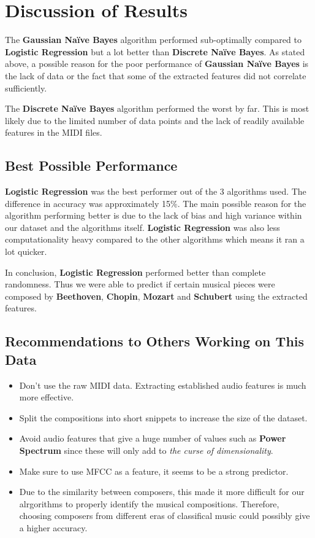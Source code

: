 \documentclass[11pt]{article}
\providecommand{\tightlist}{%
      \setlength{\itemsep}{0pt}\setlength{\parskip}{0pt}}
\begin{document}
\newpage

\section{Discussion of Results}\label{discussion-of-results}

The \textbf{Gaussian Naïve Bayes} algorithm performed sub-optimally
compared to \textbf{Logistic Regression} but a lot better than
\textbf{Discrete Naïve Bayes}. As stated above, a possible reason for
the poor performance of \textbf{Gaussian Naïve Bayes} is the lack of
data or the fact that some of the extracted features did not correlate
sufficiently.

The \textbf{Discrete Naïve Bayes} algorithm performed the worst by far.
This is most likely due to the limited number of data points and the
lack of readily available features in the MIDI files.

\subsection{Best Possible Performance}\label{best-possible-performance}

\textbf{Logistic Regression} was the best performer out of the 3
algorithms used. The difference in accuracy was approximately 15\%. The
main possible reason for the algorithm performing better is due to the
lack of bias and high variance within our dataset and the algorithms
itself. \textbf{Logistic Regression} was also less computationality
heavy compared to the other algorithms which means it ran a lot quicker.

In conclusion, \textbf{Logistic Regression} performed better than
complete randomness. Thus we were able to predict if certain musical
pieces were composed by \textbf{Beethoven}, \textbf{Chopin},
\textbf{Mozart} and \textbf{Schubert} using the extracted features.

\subsection{Recommendations to Others Working on This
Data}\label{recommendations-to-others-working-on-this-data}

\begin{itemize}
\tightlist
\item
  Don't use the raw MIDI data. Extracting established audio features is
  much more effective.
\item
  Split the compositions into short snippets to increase the size of the
  dataset.
\item
  Avoid audio features that give a huge number of values such as
  \textbf{Power Spectrum} since these will only add to \emph{the curse
  of dimensionality}.
\item
  Make sure to use MFCC as a feature, it seems to be a strong predictor.
\item
  Due to the similarity between composers, this made it more difficult
  for our alrgorithms to properly identify the musical compositions.
  Therefore, choosing composers from different eras of classifical music
  could possibly give a higher accuracy.
\end{itemize}
\end{document}

